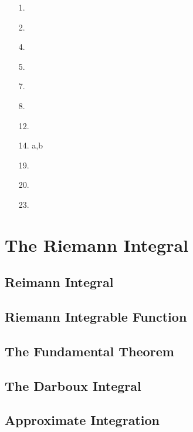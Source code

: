 \documentclass[letter paper, 11pt]{article}
\begin{document}
\begin{itemize}
    \item[1.]
    
        
    
    \item[2.]
    
        
    
    \item[4.]
    
        
    
    \item[5.]
    
        
    
    \item[7.]
    
        
    
    \item[8.]
    
        
    
    \item[12.]
    
        
    
    \item[14.] a,b
    
        
    
    \item[19.]
    
        
    
    \item[20.]
    
        
    
    \item[23.]
    
        
    
\end{itemize}

\section{The Riemann Integral}
\subsection{Reimann Integral}
\subsection{Riemann Integrable Function}
\subsection{The Fundamental Theorem}
\subsection{The Darboux Integral}
\subsection{Approximate Integration}
\end{document}
